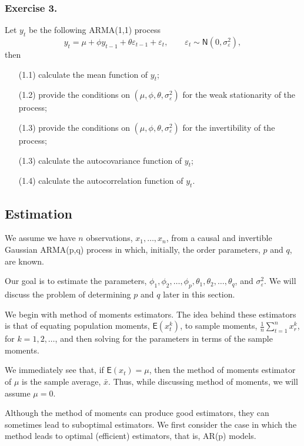 \documentclass[
paper=128mm:96mm, %
fontsize=9.5pt, %
pagesize, %
parskip=half-, %
]{scrartcl} %
\theoremstyle{mythmstyle} %
\begin{document}
\subsubsection*{Exercise 3.}
Let $y_t$ be the following ARMA(1,1) process
%
\begin{equation}
y_t=\mu+\phi y_{t-1}+\theta \varepsilon_{t-1}+\varepsilon_{t},\qquad\varepsilon_t\sim\mathsf{N}\left(0,\sigma_\varepsilon^2\right),\nonumber
\end{equation}
then
\begin{itemize}
\item[(1.1)] calculate the mean function of $y_t$;
\item[(1.2)] provide the conditions on $\left(\mu,\phi,\theta,\sigma_\varepsilon^2\right)$ for the weak stationarity of the process;
\item[(1.3)] provide the conditions on $\left(\mu,\phi,\theta,\sigma_\varepsilon^2\right)$ for the invertibility of the process;
\item[(1.3)] calculate the autocovariance function of $y_t$;
\item[(1.4)] calculate the autocorrelation function of $y_t$.
\end{itemize}




\subsection{Estimation}


We assume we have $n$ observations, $x_1,\dots,x_n$, from a causal and invertible Gaussian ARMA(p,q) process in which, initially, the order parameters, $p$ and $q$, are known. 

Our goal is to estimate the parameters, $\phi_1,\phi_2,\dots,\phi_p,\theta_1,\theta_2,\dots,\theta_q$, and $\sigma_\varepsilon^2$. We will discuss the problem of determining $p$ and $q$ later in this section.

We begin with method of moments estimators. The idea behind these estimators is that of equating population moments, $\mathsf{E}\left(x_{t}^k\right)$, to sample moments,
$\frac{1}{n}\sum_{t=1}^nx_r^k$, for $k=1,2,\dots$, and then solving for the parameters in terms of the sample moments. 

We immediately see that, if $\mathsf{E}\left(x_t\right)=\mu$, then the method of moments estimator of $\mu$ is the sample average, $\bar{x}$. Thus, while discussing method of moments, we will assume $\mu=0$. 

Although the method of moments can produce good estimators, they can sometimes lead to suboptimal estimators. We first consider the case in which the method leads to optimal (efficient) estimators, that is, AR(p) models.
\end{document}
